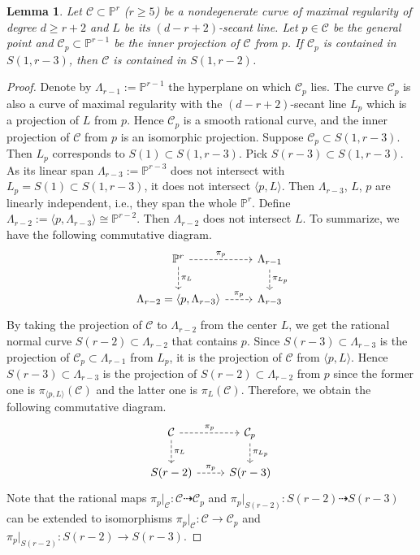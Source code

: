 \documentclass[11pt,letterpaper,reqno]{amsart}
\theoremstyle{plain}
\newtheorem{lemma}[theorem]{Lemma}
\theoremstyle{definition}
\newtheorem{open problem}[theorem]{Open Problem}
\newtheorem{remark and notation}[theorem]{Remark and Notation}
\newtheorem{remark and definition}[theorem]{Remark and Definition}
\newtheorem{definition and notation}[theorem]{Definition and Notation}
\newtheorem{notation and convention}[theorem]{Notation and Convention}
\newtheorem{notation and remark}[theorem]{Notation and Remark}
\newtheorem{convention and notation}[theorem]{Convention and Notation}
\def \p {\mathbb{P}}
\begin{document}
\begin{lemma}\label{lem:maxreg_lifting}
    Let $\mathcal{C}\subset\p^r$ ($r\geq 5$) be a nondegenerate curve of maximal regularity of degree $d\geq r+2$ and $L$ be its $(d-r+2)$-secant line. Let $p\in \mathcal{C}$ be the general point and $\mathcal{C}_p\subset\p^{r-1}$ be the inner projection of $\mathcal{C}$ from $p$. If $\mathcal{C}_p$ is contained in $S(1,r-3)$, then $\mathcal{C}$ is contained in $S(1,r-2)$.
\end{lemma}
\begin{proof}
    Denote by $\Lambda_{r-1} := \mathbb{P}^{r-1}$ the hyperplane on which $\mathcal{C}_p$ lies.
    The curve $\mathcal{C}_p$ is also a curve of maximal regularity with the $(d-r+2)$-secant line $L_p$ which is a projection of $L$ from $p$.
    Hence $\mathcal{C}_p$ is a smooth rational curve, and the inner projection of $\mathcal{C}$ from $p$ is an isomorphic projection.
    Suppose $\mathcal{C}_p\subset S(1,r-3)$.
    Then $L_p$ corresponds to $S(1)\subset S(1,r-3)$.
    Pick $S(r-3)\subset S(1,r-3)$.
    As its linear span $\Lambda_{r-3}:=\p^{r-3}$ does not intersect with $L_p=S(1)\subset S(1,r-3)$, it does not intersect $\langle p,L\rangle$.
    Then $\Lambda_{r-3}$, $L$, $p$ are linearly independent, i.e., they span the whole $\p^r$.
    Define $\Lambda_{r-2}:=\langle p,\Lambda_{r-3}\rangle\cong\p^{r-2}$. Then $\Lambda_{r-2}$ does not intersect $L$.
    To summarize, we have the following commutative diagram.
    \[\begin{tikzcd}
        \p^r\arrow[r,dashed,"\pi_p"]\arrow[d,dashed,"\pi_L"]&\Lambda_{r-1}\arrow[d,dashed,"\pi_{L_p}"]\\
        \Lambda_{r-2}=\langle p,\Lambda_{r-3}\rangle\arrow[r,dashed,"\pi_p"]&\Lambda_{r-3}
    \end{tikzcd}\]
    By taking the projection of $\mathcal{C}$ to $\Lambda_{r-2}$ from the center $L$, we get the rational normal curve $S(r-2)\subset \Lambda_{r-2}$ that contains $p$. 
    Since $S(r-3)\subset\Lambda_{r-3}$ is the projection of $\mathcal{C}_p\subset\Lambda_{r-1}$ from $L_p$, it is the projection of $\mathcal{C}$ from $\langle p,L\rangle$.
    Hence $S(r-3)\subset\Lambda_{r-3}$ is the projection of $S(r-2)\subset \Lambda_{r-2}$ from $p$ since the former one is $\pi_{\langle p,L\rangle}(\mathcal{C})$ and the latter one is $\pi_L(\mathcal{C})$.
    Therefore, we obtain the following commutative diagram.
    \[\begin{tikzcd}
        \mathcal{C}\arrow[r,dashed,"\pi_p"]\arrow[d,dashed,"\pi_L"]&\mathcal{C}_p\arrow[d,dashed,"\pi_{L_p}"]\\
        S(r-2)\arrow[r,dashed,"\pi_p"]&S(r-3)
    \end{tikzcd}\]
    Note that the rational maps $\pi_p|_{\mathcal{C}}:\mathcal{C}\dashrightarrow \mathcal{C}_p$ and $\pi_p|_{S(r-2)}:S(r-2)\dashrightarrow S(r-3)$ can be extended to isomorphisms $\pi_p|_{\mathcal{C}}:\mathcal{C}\to \mathcal{C}_p$ and $\pi_p|_{S(r-2)}:S(r-2)\to S(r-3)$.
    

\end{proof}
\end{document}
